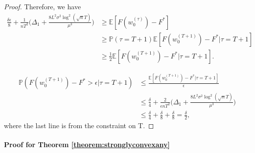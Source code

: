 \documentclass{article} %
\theoremstyle{plain}
\theoremstyle{definition}
\theoremstyle{remark}
\begin{document}
\begin{proof}
    Therefore, we have 
    \begin{align*}
        \frac{\delta\epsilon}{8}+\frac{1}{nT^2}\Big(\Delta_1+\frac{8L^2\sigma^2\log^2(\sqrt{n}T)}{\mu^3}\Big)&\geq \mathbb{E}[F(w^{(\tau)}_0)-F^*] \\
        & \geq \mathbb{P}(\tau=T+1)\mathbb{E}[F(w^{(T+1)}_0)-F^*|\tau=T+1] \\
        & \geq \frac{1}{2}\mathbb{E}[F(w^{(T+1)}_0)-F^*|\tau=T+1].
    \end{align*}

    \begin{align*}
    \mathbb{P}(F(w^{(T+1)}_0)-F^*>\epsilon|\tau=T+1)&\leq \frac{\mathbb{E}[F(w^{(T+1)}_0)-F^*|\tau=T+1]}{\epsilon} \\
    &\leq \frac{\delta}{4}+\frac{2}{\epsilon nT^2}\Big(\Delta_1+\frac{8L^2\sigma^2\log^2(\sqrt{n}T)}{\mu^3}\Big)\\
    & \leq \frac{\delta}{4}+\frac{\delta}{8}+\frac{\delta}{8}=\frac{\delta}{2},
    \end{align*}
    where the last line is from the constraint on T.

\end{proof}

\paragraph{Proof for Theorem \ref{theorem:stronglyconvexany}}
\end{document}

